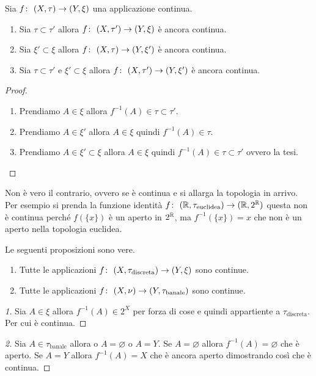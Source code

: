 \begin{theorem}
	Sia $f \colon\ (X,\tau) \rightarrow (Y,\xi)$ una applicazione continua. 
	\begin{enumerate}
		\item Sia $\tau \subset \tau'$ allora $f \colon\ (X,\tau') \rightarrow (Y,\xi)$ è ancora continua.
		\item Sia $\xi' \subset \xi$ allora $f \colon\ (X,\tau) \rightarrow (Y,\xi')$ è ancora continua.
		\item Sia $\tau \subset \tau'$ e $\xi' \subset \xi$ allora $f \colon\ (X,\tau') \rightarrow (Y,\xi')$ è ancora continua.
	\end{enumerate}
\end{theorem}
\begin{proof}
	\begin{enumerate}
		\item Prendiamo $A \in \xi$ allora $f^{-1}(A) \in \tau \subset \tau'$.
		\item Prendiamo $A \in \xi'$ allora $A \in \xi$ quindi $f^{-1}(A) \in \tau$. 
		\item Prendiamo $A \in \xi' \subset \xi$ allora $A \in \xi$ quindi $f^{-1}(A) \in \tau \subset \tau'$ ovvero la tesi.
	\end{enumerate}
\end{proof}

\begin{remark}
	Non è vero il contrario, ovvero se è continua e si allarga la topologia in arrivo. Per esempio si prenda la funzione identità $f \colon\ (\mathbb{R}, \tau_{\text{euclidea}}) \rightarrow (\mathbb{R}, 2^{\mathbb{R}})$ questa non è continua perché $f(\{x\})$ è un aperto in $2^{\mathbb{R}}$, ma $f^{-1}(\{x\}) = x$ che non è un aperto nella topologia euclidea.
\end{remark}

\begin{theorem}
	Le seguenti proposizioni sono vere.
	\begin{enumerate}
		\item Tutte le applicazioni $f \colon\ (X,\tau_{\text{discreta}}) \rightarrow (Y,\xi)$ sono continue.
		\item Tutte le applicazioni $f \colon\ (X,\nu) \rightarrow (Y,\tau_{\text{banale}})$ sono continue.
	\end{enumerate}
\end{theorem}
\begin{proof}[1]
	Sia $A\in \xi$ allora $f^{-1}(A) \in 2^X$ per forza di cose e quindi appartiente a $\tau_{\text{discreta}}$. Per cui è continua.
\end{proof}
\begin{proof}[2]
	Sia $A \in \tau_{\text{banale}}$ allora o $A = \varnothing$ o $A = Y$. Se $A = \varnothing$ allora $f^{-1}(A) = \varnothing$ che è aperto. Se $A = Y$ allora $f^{-1}(A) = X$ che è ancora aperto dimostrando così che è continua.
\end{proof}

